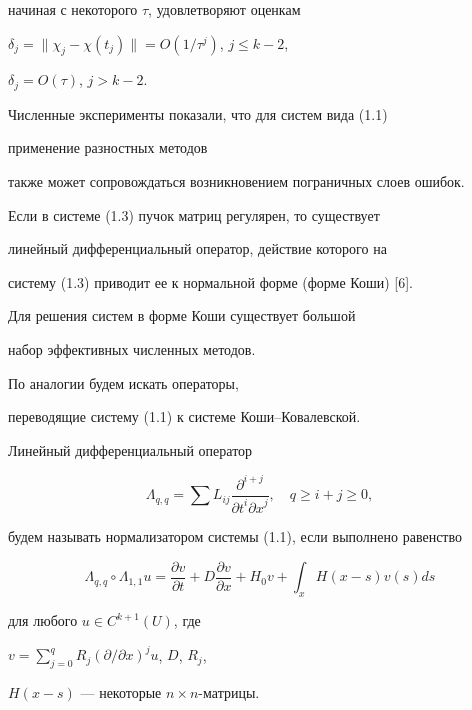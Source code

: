 начиная с некоторого $\tau $, удовлетворяют оценкам


$\delta _{j}=\| \chi _{j}-\chi (t_{j})\|=O(1/\tau ^j)$, $j\leq k-2$,


$\delta _j=O(\tau )$, $j>k-2$.





Численные эксперименты показали, что для систем вида (1.1)


применение разностных методов


также может сопровождаться возникновением пограничных слоев ошибок.


Если в системе (1.3) пучок матриц регулярен, то существует


линейный дифференциальный оператор, действие которого на


систему (1.3) приводит ее к нормальной форме (форме Коши) [6].


Для решения систем в форме Коши существует большой


набор эффективных численных методов.


По аналогии будем искать операторы,


переводящие систему (1.1) к системе Коши--Ковалевской.





\begin{defns}


Линейный дифференциальный оператор


$$


\Lambda _{q,q}=


\sum L_{ij}\frac{\partial ^{i+j} }{{\partial t}^{i}{\partial x}^{j}},\quad


q\geq i+j\geq 0,


$$


будем называть нормализатором системы (1.1), если выполнено равенство


\begin{equation}


\Lambda _{q,q}\circ\Lambda _{1,1}u=


\frac{\partial v }{\partial t}+D\frac{\partial v }{\partial x}+


H_{0}v+\int_{x}H(x-s)v(s)ds


\end{equation}


для любого $u\in C^{k+1}(U)$, где


$v=\sum \limits _{j=0}^{q}R_{j}(\partial /\partial x)^{j}u$, $D$, $R_j$,


$H(x-s)$ --- некоторые $n\times n$-матрицы.


\end{defns}






